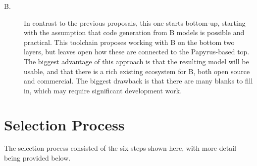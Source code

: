 \begin{description}
\item[B.] In contrast to the previous proposals, this one starts bottom-up, starting with the assumption that code generation from B models is possible and practical.   This toolchain proposes working with B on the bottom two layers, but leaves open how these are connected to the Papyrus-based top.  The biggest advantage of this approach is that the resulting model will be usable, and that there is a rich existing ecosystem for B, both open source and commercial.  The biggest drawback is that there are many blanks to fill in, which may require significant development work.

\end{description}

\section{Selection Process}

The selection process consisted of the six steps shown here, with more detail being provided below.

